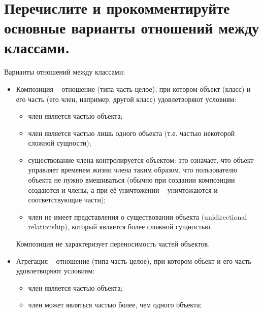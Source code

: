 \documentclass[a4paper,12pt]{article}	%
\title{
	\center{\textbf{Контрольные вопросы}}
	}
\begin{document}

\maketitle

\section{Перечислите и прокомментируйте основные варианты отношений между классами.}
	
	Варианты отношений между классами:
	
	\begin{itemize}
	
		\item Композиция -- отношение (типа часть-целое), при котором объект (класс) и его часть (его член, например, другой класс) удовлетворяют условиям:
		
		\begin{itemize}
			
			\item член является частью объекта;
			
			\item член является частью лишь одного объекта (т.е. частью некоторой сложной сущности);
			
			\item существование члена контролируется объектом: это означает, что объект управляет временем жизни члена таким образом, что пользователю объекта не нужно вмешиваться (обычно при создании композиции создаются и члены, а при её уничтожении -- уничтожаются и соответствующие части);
			
			\item член не имеет представления о существовании объекта (unidirectional relationship), который является более сложной сущностью.
		
		\end{itemize}
		
		Композиция не характеризует переносимость частей объектов.
		
		\item Агрегация -- отношение (типа часть-целое), при котором объект и его часть удовлетворяют условиям:
	
		\begin{itemize}
			
			\item член является частью объекта;
			
			\item член может являться частью более, чем одного объекта;
			

\end{itemize}
\end{itemize}
\end{document}
